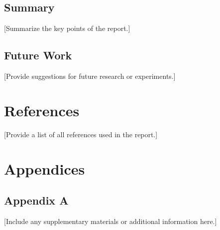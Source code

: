 \documentclass[journal]{IEEEtran}
\begin{document}
\subsection{Summary}
[Summarize the key points of the report.]

\subsection{Future Work}
[Provide suggestions for future research or experiments.]

\section{References}
[Provide a list of all references used in the report.]

\section{Appendices}
\subsection{Appendix A}
[Include any supplementary materials or additional information here.]
\end{document}
